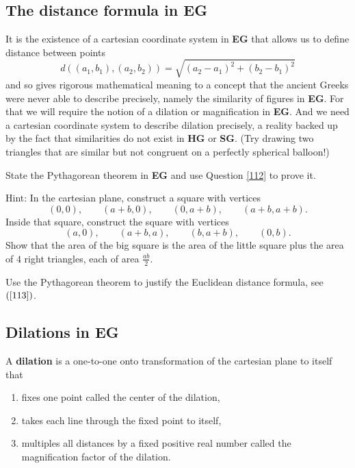 \pagebreak

\subsection*{The distance formula in \textbf{EG}}

It is the existence of a cartesian coordinate system in \textbf{EG} that
allows us to define distance between points%
\begin{equation}
d\left(  \left(  a_{1},b_{1}\right)  ,\left(  a_{2},b_{2}\right)  \right)
=\sqrt{\left(  a_{2}-a_{1}\right)  ^{2}+\left(  b_{2}-b_{1}\right)  ^{2}}
\label{113}%
\end{equation}
and so gives rigorous mathematical meaning to a concept that the ancient
Greeks were never able to describe precisely, namely the similarity of figures
in \textbf{EG}. For that we will require the notion of a dilation or
magnification in \textbf{EG}. And we need a cartesian coordinate system to
describe dilation precisely, a reality backed up by the fact that similarities
do not exist in \textbf{HG} or \textbf{SG}. (Try drawing two triangles that
are similar but not congruent on a perfectly spherical balloon!)

\begin{question}
State the Pythagorean theorem in \textbf{EG} and use Question
\ref{112} to prove it.

Hint: In the cartesian plane, construct a square with vertices 
\[
\left(0,0\right),\qquad \left(a+b,0\right),\qquad \left(0,a+b\right), \qquad \left( a+b,a+b\right).
\] 
Inside that square, construct the square with vertices 
\[
\left(a,0\right),\qquad \left(a+b,a\right),\qquad \left(b,a+b\right), \qquad \left(0,b\right).
\]
Show that the area of the big square is the area of the little square
plus the area of $4$ right triangles, each of area $\frac{ab}{2}$.
\end{question}

\begin{question}
Use the Pythagorean theorem to justify the Euclidean distance formula,
see $\left(\ref{113}\right)$.
\end{question}

\pagebreak

\subsection*{Dilations in \textbf{EG}}

\begin{definition}
A \textbf{dilation} is a one-to-one onto transformation of the
cartesian plane to itself that
\begin{enumerate}
\item fixes one point called the center of the dilation,
\item takes each line through the fixed point to itself,
\item multiples all distances by a fixed positive real number called the
magnification factor of the dilation.
\end{enumerate}
\end{definition}

